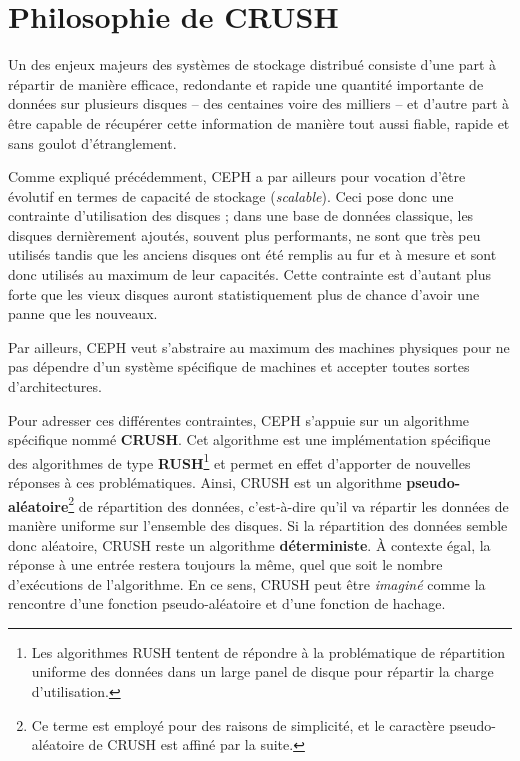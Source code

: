 \section{Philosophie de CRUSH}

\begin{PimpedBox}
Un des enjeux majeurs des systèmes de stockage distribué consiste d'une part à répartir de manière efficace, redondante et rapide une quantité importante de données sur plusieurs disques -- des centaines voire des milliers -- et d'autre part à être capable de récupérer cette information de manière tout aussi fiable, rapide et sans goulot d'étranglement.
\end{PimpedBox}

Comme expliqué précédemment, CEPH a par ailleurs pour vocation d'être évolutif en termes de capacité de stockage (\textit{scalable}). Ceci pose donc une contrainte d'utilisation des disques ; dans une base de données classique, les disques dernièrement ajoutés, souvent plus performants, ne sont que très peu utilisés tandis que les anciens disques ont été remplis au fur et à mesure et sont donc utilisés au maximum de leur capacités. Cette contrainte est d'autant plus forte que les vieux disques auront statistiquement plus de chance d'avoir une panne que les nouveaux. 

Par ailleurs, CEPH veut s'abstraire au maximum des machines physiques pour ne pas dépendre d'un système spécifique de machines et accepter toutes sortes d'architectures.

Pour adresser ces différentes contraintes, CEPH s'appuie sur un algorithme spécifique nommé \textbf{CRUSH}. Cet algorithme est une implémentation spécifique des algorithmes de type \textbf{RUSH}\footnote{Les algorithmes RUSH tentent de répondre à la problématique de répartition uniforme des données dans un large panel de disque pour répartir la charge d'utilisation.} et permet en effet d'apporter de nouvelles réponses à ces problématiques. Ainsi, CRUSH est un algorithme \textbf{pseudo-aléatoire}\footnote{Ce terme est employé pour des raisons de simplicité, et le caractère \og{}pseudo-aléatoire\fg{} de CRUSH est affiné par la suite.} de répartition des données, c'est-à-dire qu'il va répartir les données de manière uniforme sur l'ensemble des disques. Si la répartition des données semble donc aléatoire, CRUSH reste un algorithme \textbf{déterministe}. À contexte égal, la réponse à une entrée restera toujours la même, quel que soit le nombre d'exécutions de l'algorithme. En ce sens, CRUSH peut être \textit{imaginé} comme la rencontre d'une fonction pseudo-aléatoire et d'une fonction de hachage.

